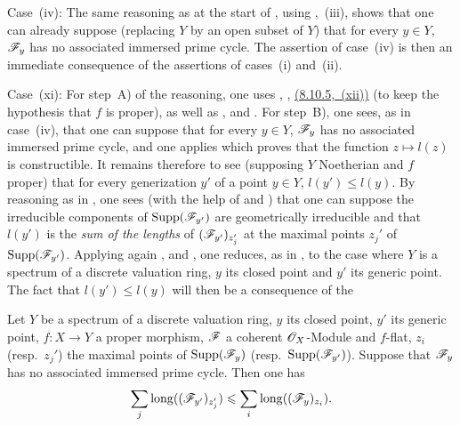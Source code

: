\begin{env}[12.2.1.2]
\label{IV.12.2.1.2}
Case~(iv): The same reasoning as at the start of , using ,~(iii), shows that one can already suppose (replacing $Y$ by an open subset of $Y$) that for every $y\in Y$, $\mathscr{F}_y$ has no associated immersed prime cycle.
The assertion of case~(iv) is then an immediate consequence of the assertions of cases~(i) and~(ii).
\end{env}

\begin{env}[12.2.1.3]
\label{IV.12.2.1.3}
Case~(xi): For step~A) of the reasoning, one uses , , {\hyperref[IV.8.10.5]{(8.10.5,~(xii))}} (to keep the hypothesis that $f$ is proper), as well as ,  and .
For step~B), one sees, as in case~(iv), that one can suppose that for every $y\in Y$, $\mathscr{F}_y$ has no associated immersed prime cycle, and one applies  which proves that the function $z\mapsto l(z)$ is constructible.
It remains therefore to see (supposing $Y$ Noetherian and $f$ proper) that for every generization $y'$ of a point $y\in Y$, $l(y')\leqslant l(y)$.
By reasoning as in , one sees (with the help of  and ) that one can suppose the irreducible components of $\operatorname{Supp}(\mathscr{F}_{y'})$ are geometrically irreducible and that $l(y')$ is the \emph{sum of the lengths} of $(\mathscr{F}_{y'})_{z_j'}$ at the maximal points $z_j'$ of $\operatorname{Supp}(\mathscr{F}_{y'})$.
Applying again ,  and , one reduces, as in , to the case where $Y$ is a spectrum of a discrete valuation ring, $y$ its closed point and $y'$ its generic point.
The fact that $l(y')\leqslant l(y)$ will then be a consequence of the

\begin{lemma}[12.2.1.4]
\label{IV.12.2.1.4}
Let $Y$ be a spectrum of a discrete valuation ring, $y$ its closed point, $y'$ its generic point, $f:X\to Y$ a proper morphism, $\mathscr{F}$ a coherent $\mathscr{O}_X$-Module and $f$-flat, $z_i$ \textnormal{(}resp.\ $z_j'$\textnormal{)} the maximal points of $\operatorname{Supp}(\mathscr{F}_y)$ \textnormal{(}resp.\ $\operatorname{Supp}(\mathscr{F}_{y'})$\textnormal{)}.
Suppose that $\mathscr{F}_y$ has no associated immersed prime cycle.
Then one has
\[
  \sum_j \operatorname{long}((\mathscr{F}_{y'})_{z_j'}) \leqslant \sum_i \operatorname{long}((\mathscr{F}_y)_{z_i}).
\]
\end{lemma}


\end{env}
